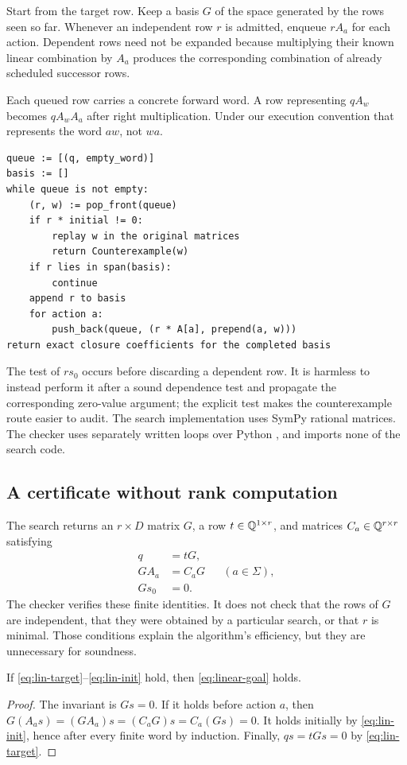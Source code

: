 Start from the target row. Keep a basis $G$ of the space generated by the rows
seen so far. Whenever an independent row $r$ is admitted, enqueue $rA_a$ for
each action. Dependent rows need not be expanded because multiplying their known
linear combination by $A_a$ produces the corresponding combination of already
scheduled successor rows.

Each queued row carries a concrete forward word. A row representing
$qA_w$ becomes $qA_wA_a$ after right multiplication. Under our execution
convention that represents the word $aw$, not $wa$.

\begin{lstlisting}
queue := [(q, empty_word)]
basis := []
while queue is not empty:
    (r, w) := pop_front(queue)
    if r * initial != 0:
        replay w in the original matrices
        return Counterexample(w)
    if r lies in span(basis):
        continue
    append r to basis
    for action a:
        push_back(queue, (r * A[a], prepend(a, w)))
return exact closure coefficients for the completed basis
\end{lstlisting}

The test of $rs_0$ occurs before discarding a dependent row. It is harmless to
instead perform it after a sound dependence test and propagate the corresponding
zero-value argument; the explicit test makes the counterexample route easier to
audit. The search implementation uses SymPy rational matrices. The checker uses
separately written loops over Python , and imports none of the
search code.

\subsection{A certificate without rank computation}

The search returns an $r\times D$ matrix $G$, a row $t\in\mathbb Q^{1\times r}$, and
matrices $C_a\in\mathbb Q^{r\times r}$ satisfying
\begin{align}
 q&=tG,\label{eq:lin-target}\\
 GA_a&=C_aG && (a\in\Sigma),\label{eq:lin-closure}\\
 Gs_0&=0.\label{eq:lin-init}
\end{align}
The checker verifies these finite identities. It does not check that the rows
of $G$ are independent, that they were obtained by a particular search, or that
$r$ is minimal. Those conditions explain the algorithm's efficiency, but they
are unnecessary for soundness.

\begin{theorem}\label{thm:linear-sound}
If \eqref{eq:lin-target}--\eqref{eq:lin-init} hold, then
\eqref{eq:linear-goal} holds.
\end{theorem}
\begin{proof}
The invariant is $Gs=0$. If it holds before action $a$, then
$G(A_as)=(GA_a)s=(C_aG)s=C_a(Gs)=0$. It holds initially by
\eqref{eq:lin-init}, hence after every finite word by induction. Finally,
$qs=tGs=0$ by \eqref{eq:lin-target}.
\end{proof}


